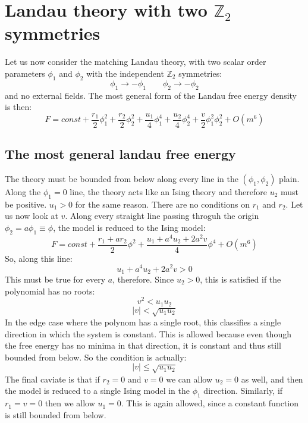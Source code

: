 \documentclass{article}
\newcommand{\Z}{\ensuremath{\mathbb{Z}}}
\begin{document}
\section{Landau theory with two $\Z_2$ symmetries}
Let us now consider the matching Landau theory, with two scalar order parameters $\phi_1$ and $\phi_2$ with the independent $\Z_2$ symmetries:
\begin{equation}
    \phi_1 \rightarrow -\phi_1
    \qquad
    \phi_2 \rightarrow -\phi_2
\end{equation}
and no external fields. The most general form of the Landau free energy density is then:
\begin{equation}
    F = const +
    \frac{r_1}{2}\phi_1^2 +
    \frac{r_2}{2}\phi_2^2 +
    \frac{u_1}{4}\phi_1^4 +
    \frac{u_2}{4}\phi_2^4 +
    \frac{v}{2}\phi_1^2\phi_2^2 +
    O(m^6)
\end{equation}
\subsection{The most general landau free energy}
The theory must be bounded from below along every line in the $(\phi_1, \phi_2)$ plain.
\newline
Along the $\phi_1 = 0$ line, the theory acts like an Ising theory and therefore $u_2$ must be positive. $u_1 > 0$ for the same reason. There are no conditions on $r_1$ and $r_2$.
\newline
Let us now look at $v$. Along every straight line passing throguh the origin $\phi_2 = a \phi_1 \equiv \phi$, the model is reduced to the Ising model:
\begin{equation}
    F = const +
    \frac{r_1 + ar_2}{2}\phi^2 +
    \frac{u_1 + a^4u_2 + 2a^2v}{4}\phi^4 +
    O(m^6)
\end{equation}
So, along this line:
\begin{equation}
    u_1 + a^4u_2 + 2a^2v > 0
\end{equation}
This must be true for every $a$, therefore. Since $u_2 > 0$, this is satisfied if the polynomial has no roots:
\begin{equation}
    v^2 < u_1u_2
\end{equation}
\begin{equation}
    |v| < \sqrt{u_1u_2}
\end{equation}
In the edge case where the polynom has a single root, this classifies a single direction in which the system is constant. This is allowed because even though the free energy has no minima in that direction, it is constant and thus still bounded from below. So the condition is actually:
\begin{equation}
    |v| \le \sqrt{u_1u_2}
\end{equation}
The final caviate is that if $r_2 = 0$ and $v = 0$ we can allow $u_2 = 0$ as well, and then the model is reduced to a single Ising model in the $\phi_1$ direction. Similarly, if $r_1 = v = 0$ then we allow $u_1 = 0$. This is again allowed, since a constant function is still bounded from below.
\end{document}
